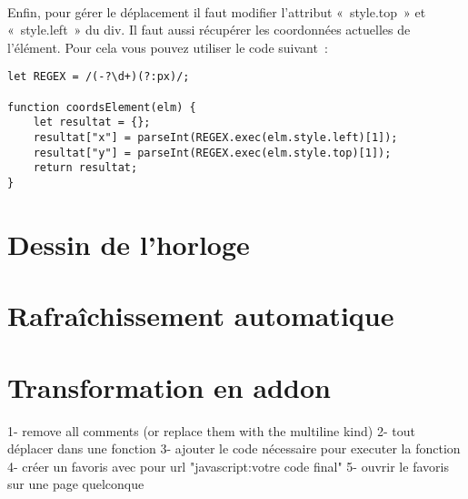 \paragraph{}
Enfin, pour gérer le déplacement il faut modifier l’attribut « style.top » et
« style.left » du div. Il faut aussi récupérer les coordonnées actuelles de
l’élément. Pour cela vous pouvez utiliser le code suivant :
\begin{verbatim}
let REGEX = /(-?\d+)(?:px)/;

function coordsElement(elm) {
    let resultat = {};
    resultat["x"] = parseInt(REGEX.exec(elm.style.left)[1]);
    resultat["y"] = parseInt(REGEX.exec(elm.style.top)[1]);
    return resultat;
}
\end{verbatim}

\section{Dessin de l’horloge}

\section{Rafraîchissement automatique}

\section{Transformation en addon}
1- remove all comments (or replace them with the multiline kind)
2- tout déplacer dans une fonction
3- ajouter le code nécessaire pour executer la fonction
4- créer un favoris avec pour url "javascript:votre code final"
5- ouvrir le favoris sur une page quelconque
